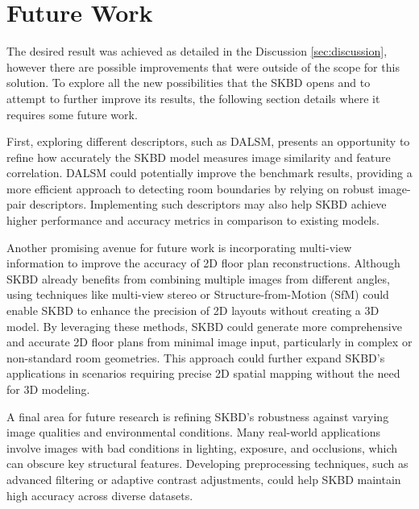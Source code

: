 \section{Future Work}
\label{sec:futurework}
The desired result was achieved as detailed in the Discussion \ref{sec:discussion}, however there are possible improvements that were outside of the scope for this solution.
To explore all the new possibilities that the SKBD opens and to attempt to further improve its results, the following section details where it requires some future work.

 First, exploring different descriptors, such as DALSM, presents an opportunity to refine how accurately the SKBD model measures image similarity and feature correlation. DALSM could potentially improve the benchmark results, providing a more efficient approach to detecting room boundaries by relying on robust image-pair descriptors. Implementing such descriptors may also help SKBD achieve higher performance and accuracy metrics in comparison to existing models.

Another promising avenue for future work is incorporating multi-view information to improve the accuracy of 2D floor plan reconstructions. Although SKBD already benefits from combining multiple images from different angles, using techniques like multi-view stereo or Structure-from-Motion (SfM) could enable SKBD to enhance the precision of 2D layouts without creating a 3D model. By leveraging these methods, SKBD could generate more comprehensive and accurate 2D floor plans from minimal image input, particularly in complex or non-standard room geometries. This approach could further expand SKBD’s applications in scenarios requiring precise 2D spatial mapping without the need for 3D modeling.

A final area for future research is refining SKBD’s robustness against varying image qualities and environmental conditions. Many real-world applications involve images with bad conditions in lighting, exposure, and occlusions, which can obscure key structural features. Developing preprocessing techniques, such as advanced filtering or adaptive contrast adjustments, could help SKBD maintain high accuracy across diverse datasets.
